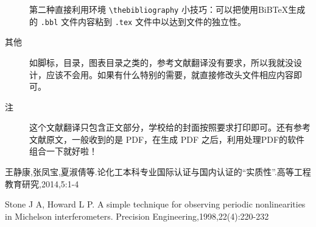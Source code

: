 \documentclass[11pt,a4paper]{article}
\newcommand{\wuhao}{\fontsize{10.5pt}{18pt}\selectfont}
\newcommand\seccontent{
	\wuhao %
    \setlength{\parindent}{2em} %
    \setlength{\parskip}{0pt}
    }
\theoremstyle{definition} \newtheorem{law}[thm]{Law}
\theoremstyle{plain} \newtheorem{jury}[thm]{Jury}
\theoremstyle{remark} \newtheorem*{marg}{Margaret}
\numberwithin{equation}{section}
\begin{document}
\begin{description}
	第二种直接利用环境 \verb*|\thebibliography| 小技巧：可以把使用BiB\TeX 生成的 \verb*|.bbl| 文件内容粘到 \verb*|.tex| 文件中以达到文件的独立性。
	
	\item[其他] 如脚标，目录，图表目录之类的，参考文献翻译没有要求，所以我就没设计，应该不会用。如果有什么特别的需要，就直接修改头文件相应内容即可。
	
	\item[注] 这个文献翻译只包含正文部分，学校给的封面按照要求打印即可。还有参考文献原文，一般收到的是 PDF，在生成 PDF 之后，利用处理PDF的软件组合一下就好啦！
\end{description}

\appendix
{}

\label{bibtexref}

\begin{thebibliography}{1}
	\label{latexref}
	\seccontent
	 王静康,张凤宝,夏淑倩等.论化工本科专业国际认证与国内认证的“实质性”.高等工程教育研究,2014,5:1-4

	 Stone J A, Howard L P. A simple technique for observing periodic nonlinearities in Michelson interferometers. Precision Engineering,1998,22(4):220-232

\end{thebibliography}
%	
\end{document}
